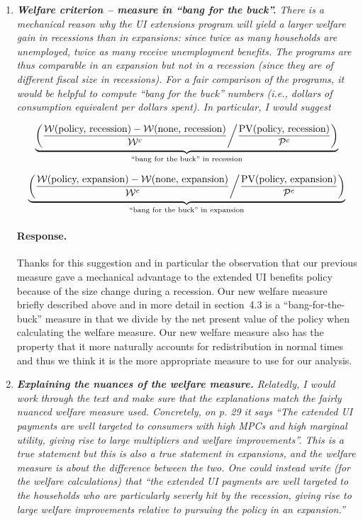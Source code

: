 \documentclass[12pt,letterpaper,english]{article}
\begin{document}
\begin{enumerate}
	\item \textit{\textbf{Welfare criterion – measure in ``bang for the buck''.} There is a mechanical reason why the UI extensions program will yield a larger welfare gain in recessions than in expansions: since twice as many households are unemployed, twice as many receive unemployment benefits. The programs are thus comparable in an expansion	but not in a recession (since they are of different fiscal size in recessions).	For a fair comparison of the programs, it would be helpful to compute ``bang for the buck'' numbers (i.e., dollars of consumption equivalent per dollars spent). In particular, I would suggest} 
	
	\[ \underbrace{\left( \frac{\mathcal{W}(\text{policy, recession}) - \mathcal{W}(\text{none, recession})}{\mathcal{W}^c} \middle/ \frac{\text{PV}(\text{policy, recession})}{\mathcal{P}^c} \right)}_{\text{``bang for the buck'' in recession}} \]
	
	\[ \underbrace{\left( \frac{\mathcal{W}(\text{policy, expansion}) - \mathcal{W}(\text{none, expansion})}{\mathcal{W}^c} \middle/ \frac{\text{PV}(\text{policy, expansion})}{\mathcal{P}^c} \right)}_{\text{``bang for the buck'' in expansion}} \]

	\paragraph{Response.} Thanks for this suggestion and in particular the observation that our previous measure gave a mechanical advantage to the extended UI benefits policy because of the size change during a recession. Our new welfare measure briefly described above and in more detail in section~4.3 is a ``bang-for-the-buck'' measure in that we divide by the net present value of the policy when calculating the welfare measure. Our new welfare measure also has the property that it more naturally accounts for redistribution in normal times and thus we think it is the more appropriate measure to use for our analysis.

	\item \textit{\textbf{Explaining the nuances of the welfare measure.} Relatedly, I would work through the text and make sure that the explanations	match the fairly nuanced welfare measure used. Concretely, on p. 29 it says ``The extended UI payments are well targeted to consumers with high MPCs and high marginal utility, giving rise to large multipliers and welfare improvements''. This is a true statement but this is also a true statement in expansions, and the welfare measure is about the difference between the two. One could instead write (for the welfare calculations) that ``the extended UI payments are well targeted to the households who are particularly severly hit by the recession, giving rise to large welfare improvements relative to pursuing the policy in an expansion.''} 
	

\end{enumerate}
\end{document}
